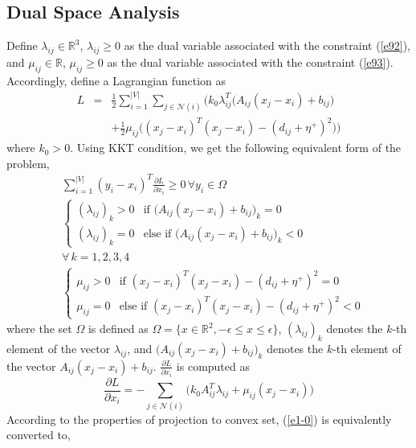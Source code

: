 \documentclass[journal]{IEEEtran}
\begin{document}
\subsection{Dual Space Analysis}
Define $\lambda_{ij}\in\mathbb{R}^3$, $\lambda_{ij}\geq 0$ as the dual variable associated with the constraint (\ref{e92}), and $\mu_{ij}\in\mathbb{R}$, $\mu_{ij}\geq 0$ as the dual variable associated with the constraint (\ref{e93}). Accordingly, define a Lagrangian function as \begin{eqnarray}
L&=&\frac{1}{2}\sum_{i=1}^{|V|}\sum_{j\in\mathcal{N}(i)}\bigg(k_0\lambda_{ij}^T\big(A_{ij}(x_j-x_i)+b_{ij}\big)\nonumber\\
&&+\frac{1}{2}\mu_{ij}\big((x_j-x_i)^T(x_j-x_i)-(d_{ij}+\eta^+)^2\big)\bigg)
\end{eqnarray}
where $k_0>0$. Using KKT condition, we get the following equivalent form of the problem,
\begin{subequations}\label{e1-0}
\begin{align}
&\sum_{i=1}^{|V|}(y_i-x_i)^T\frac{\partial L}{\partial x_i}\geq 0\, \forall y_i\in\Omega\\
&\begin{cases}
   (\lambda_{ij})_k>0        & \text{if } \big(A_{ij}(x_j-x_i)+b_{ij}\big)_k=0 \\
   (\lambda_{ij})_k=0        & \text{else if } \big(A_{ij}(x_j-x_i)+b_{ij}\big)_k<0
  \end{cases}\\
&\forall\,k=1,2,3,4\\
&\begin{cases}
   \mu_{ij}>0        & \text{if } (x_j-x_i)^T(x_j-x_i)-(d_{ij}+\eta^+)^2=0 \\
    \mu_{ij}=0        & \text{else if } (x_j-x_i)^T(x_j-x_i)-(d_{ij}+\eta^+)^2<0
  \end{cases}
\end{align}
\end{subequations}
where the set $\Omega$ is defined as $\Omega=\{x\in\mathbb{R}^2, -\epsilon\leq x\leq \epsilon\}$, $(\lambda_{ij})_k$ denotes the $k$-th element of the vector $\lambda_{ij}$, and $\big(A_{ij}(x_j-x_i)+b_{ij}\big)_k$ denotes the $k$-th element of the vector $A_{ij}(x_j-x_i)+b_{ij}$. $\frac{\partial L}{\partial x_i}$ is computed as
\begin{equation}\label{e1-01}
\frac{\partial L}{\partial x_i}=-\sum_{j\in\mathcal{N}(i)}\big(k_0A^T_{ij}\lambda_{ij}+\mu_{ij}(x_j-x_i)\big)
\end{equation}
According to the properties of projection to convex set, (\ref{e1-0}) is equivalently converted to,
\end{document}
